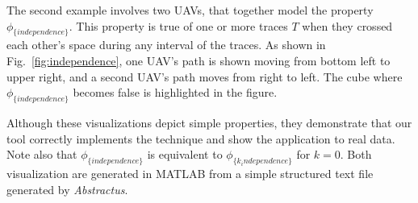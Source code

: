 The second example involves two UAVs, that together model the property $\phi_{\{independence\}}$.
This property is true of one or more traces $T$ when they crossed each other's space during any interval of the traces.
As shown in Fig.~\ref{fig:independence}, one UAV's path is shown moving from bottom left to upper right, and a second UAV's path moves from right to left.
The cube where $\phi_{\{independence\}}$ becomes false is highlighted in the figure.


Although these visualizations depict simple properties, they demonstrate that our tool correctly implements the technique and show the application to real data.
Note also that $\phi_{\{independence\}}$ is equivalent to $\phi_{\{k_independence\}}$ for $k=0$.
Both visualization are generated in MATLAB from a simple structured text file generated by \emph{Abstractus}.

